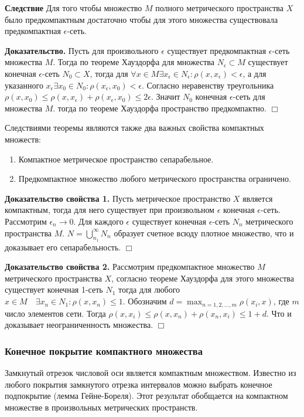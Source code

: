 \documentclass[14pt,a4paper]{extarticle}
\theoremstyle{definition}
\theoremstyle{remark}
\renewcommand{\[}{\begin{dmath*}[compact]}
\renewcommand{\]}{\end{dmath*}}
\newcommand{\be}{\begin{enumerate}}
\newcommand{\ee}{\end{enumerate}}
\newcommand{\btev}[1][]{\textbf{Доказательство#1.}
}
\newcommand{\etev}{$\Box$}
\begin{document}
\textbf{Следствие} Для того чтобы множество $M$ полного метрического пространства $X$ было предкомпактным достаточно чтобы для этого множества существовала предкомпактная $\epsilon$-сеть.

\btev[] Пусть для произвольного $\epsilon$ существует предкомпактная $\epsilon$-сеть множества $M$. Тогда по теореме Хауздорфа для множества $N_\epsilon \subset M$ существует конечная $\epsilon$-сеть $N_0 \subset X$, тогда для $\forall x \in M \exists x_\epsilon \in N_\epsilon: \rho(x,x_\epsilon) < \epsilon$, а для указанного $x_\epsilon \exists x_0\in N_0: \rho(x_\epsilon,x_0)<\epsilon$. Согласно неравенству треугольника $\rho(x,x_0)\leq \rho(x,x_\epsilon) + \rho(x_\epsilon,x_0) \leq 2\epsilon$. Значит $N_0$ конечная $\epsilon$-сеть для множества $M$. тогда по теореме Хауздорфа пространство предкомпактно. \etev

Следствиями теоремы являются также два важных свойства компактных множеств:

\be
  \item Компактное метрическое пространство сепарабельное.
  \item Предкомпактное множество любого метрического пространства ограничено.
\ee

\btev[ свойства 1] Пусть метрическое пространство $X$ является компактным, тогда для него существует при произвольном $\epsilon$ конечная $\epsilon$-сеть. Рассмотрим $\epsilon_n \to 0$. Для каждого $\epsilon$ существует конечная $\epsilon$-сеть $N_n$ метрического пространства $M$. $N=\bigcup _{n_1}^{\infty} N_n$ образует счетное всюду плотное множество, что и доказывает его сепарабельность. \etev

\btev[ свойства 2] Рассмотрим предкомпактное множество $M$ метрического пространства $X$, согласно теореме Хауздорфа для этого множества существует конечная 1-сеть $N_1$ тогда для любого $x \in M\quad \exists x_n \in N_1: \rho(x, x_n) \leq 1$. Обозначим $d=\max_{n=1,2,\dots,m}\rho(x_i,x)$, где $m$ число элементов сети. Тогда $\rho(x, x_i) \leq \rho(x, x_n)+\rho(x_n, x_i) \leq 1+d$. Что и доказывает неограниченность множества. \etev

\subsubsection{Конечное покрытие компактного множества}

Замкнутый отрезок числовой оси является компактным множеством. Известно из любого покрытия замкнутого отрезка интервалов можно выбрать конечное подпокрытие (лемма Гейне-Бореля). Этот результат обобщается на компактном множестве в произвольных метрических пространств.
\end{document}
